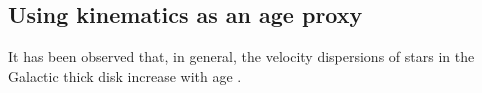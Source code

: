 
\subsection{Using kinematics as an age proxy}

It has been observed that, in general, the velocity dispersions of stars in
the Galactic thick disk increase with age \citep[\eg][]{stromberg1946,
wielen1977, nordstrom2004, aumer2009, casagrande2011, ting2019, yu2019}.


